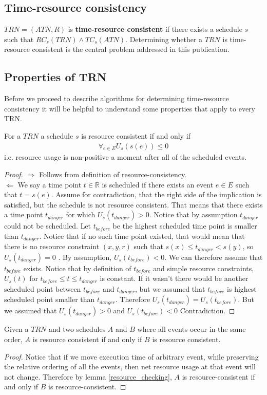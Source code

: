 \subsection{Time-resource consistency}
$TRN=(ATN, R)$ is \textbf{time-resource consistent} if there exists a schedule $s$ such that $RC_s(TRN) \wedge TC_s(ATN)$. Determining whether a $TRN$ is time-resource consistent is the central problem addressed in this publication.

\subsection{Properties of TRN}
Before we proceed to describe algorithms for determining time-resource consistency it will be helpful to understand some properties that apply to every TRN.
\begin{lemma}
\label{resource_checking}
For a $TRN$ a schedule $s$ is resource consistent if and only if
\begin{align}
\label{eq:resource_consistency} \forall_{e \in E} U_s(s(e)) \leq 0
\end{align}
i.e. resource usage is non-positive a moment after all of the scheduled events.
\end{lemma}
\begin{proof}

$\Rightarrow$ Follows from definition of resource-consistency.\\
$\Leftarrow$ We say a time point $t \in \mathbb{R}$ is scheduled if there exists an event  $e \in E$ such that $t = s(e)$. Assume for contradiction, that the right side of the implication is satisfied, but the schedule is not resource consistent. That means that there exists a time point $t_{danger}$ for which $U_s(t_{danger}) > 0 $. Notice that by assumption $t_{danger}$ could not be scheduled. Let $t_{before}$ be the highest scheduled time point is smaller than $t_{danger}$. Notice that if no such time point existed, that would mean that there is no resource constraint $(x,y,r)$ such that $s(x) \leq t_{danger} < s(y)$, so $U_s(t_{danger})=0$ . By assumption, $U_s(t_{before}) < 0$.  We can therefore assume that $t_{before}$ exists. Notice that by definition of $t_{before}$ and simple resource constraints, $U_s(t)$ for $t_{before} \leq t \leq t_{danger}$ is constant. If it wasn't there would be another scheduled point between $t_{before}$ and $t_{danger}$, but we assumed that $t_{before}$ is highest scheduled point smaller than $t_{danger}$. Therefore $ U_s(t_{danger}) = U_s(t_{before})$. But we assumed that $U_s(t_{danger}) > 0$ and $U_s(t_{before}) < 0 $ Contradiction.
\end{proof}
\begin{corollary}
\label{cor:ordering}
Given a $TRN$ and two schedules $A$ and $B$ where all events occur in the same order, $A$ is resource consistent if and only if $B$ is resource consistent.
\end{corollary}
\begin{proof}
Notice that if we move execution time of arbitrary event, while preserving the relative ordering of all the events, then net resource usage at that event will not change. Therefore by lemma \ref{resource_checking},  $A$ is resource-consistent if and only if $B$ is resource-consistent.
\end{proof}
